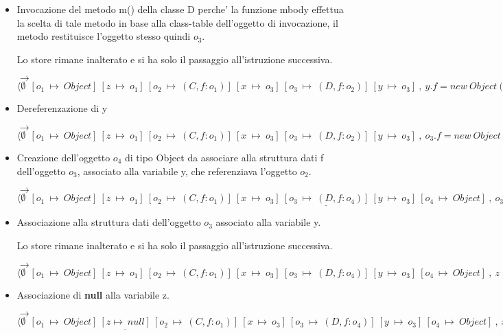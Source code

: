 \begin{itemize}
\vspace{0,5cm}
\item Invocazione del metodo m() della classe D perche' la funzione mbody effettua la scelta di tale metodo in base alla class-table dell'oggetto di invocazione, il metodo restituisce l'oggetto stesso quindi $o_3$.

Lo store rimane inalterato e si ha solo il passaggio all'istruzione successiva.

$\rightarrow$ $\langle\emptyset\:\:[o_1\:\mapsto\:Object]\:[z\:\mapsto\:o_1]\:[o_2\:\mapsto\:(C,f:o_1)]\:[x\:\mapsto\:o_3]\:[o_3\:\mapsto\:(D,f:o_2)]\:[y\:\mapsto\:o_3]\:,\:y.f=new\:Object();.....\rangle$

\vspace{0,5cm}
\item Dereferenzazione di y

$\rightarrow$ $\langle\emptyset\:\:[o_1\:\mapsto\:Object]\:[z\:\mapsto\:o_1]\:[o_2\:\mapsto\:(C,f:o_1)]\:[x\:\mapsto\:o_3]\:[o_3\:\mapsto\:(D,f:o_2)]\:[y\:\mapsto\:o_3]\:,\:o_3.f=new\:Object();.....\rangle$

\vspace{0,5cm}
\item Creazione dell'oggetto $o_4$ di tipo Object da associare alla struttura dati f dell'oggetto $o_3$, associato alla variabile y, che referenziava l'oggetto $o_2$.

$\rightarrow$ $\langle\emptyset\:\:[o_1\:\mapsto\:Object]\:[z\:\mapsto\:o_1]\:[o_2\:\mapsto\:(C,f:o_1)]\:[x\:\mapsto\:o_3]\:\underline{[o_3\:\mapsto\:(D,f:o_4)]}\:[y\:\mapsto\:o_3]\:[o_4\:\mapsto\:Object]\:,\:o_3.f=o_4;.....\rangle$

\vspace{0,5cm}
\item Associazione alla struttura dati dell'oggetto $o_3$ associato alla variabile y.

Lo store rimane inalterato e si ha solo il passaggio all'istruzione successiva.

$\rightarrow$ $\langle\emptyset\:\:[o_1\:\mapsto\:Object]\:[z\:\mapsto\:o_1]\:[o_2\:\mapsto\:(C,f:o_1)]\:[x\:\mapsto\:o_3]\:[o_3\:\mapsto\:(D,f:o_4)]\:[y\:\mapsto\:o_3]\:[o_4\:\mapsto\:Object]\:,\:z=null;.....\rangle$

\vspace{0,5cm}
\item Associazione di \textbf{null} alla variabile z. 

$\rightarrow$ $\langle\emptyset\:\:[o_1\:\mapsto\:Object]\:\underline{[z\mapsto\:null]}\:[o_2\:\mapsto\:(C,f:o_1)]\:[x\:\mapsto\:o_3]\:[o_3\:\mapsto\:(D,f:o_4)]\:[y\:\mapsto\:o_3]\:[o_4\:\mapsto\:Object]\:,\:x.f=z;.....\rangle$


\end{itemize}

